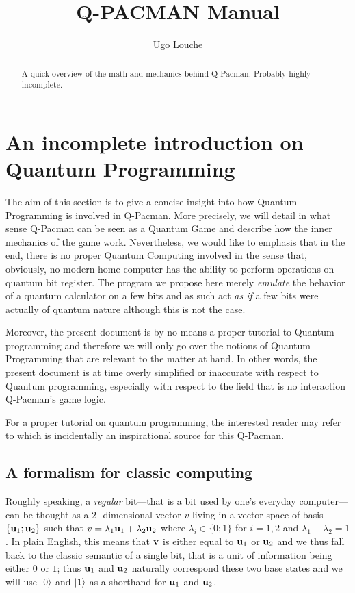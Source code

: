 \documentclass[a4paper]{article}
\title{Q-PACMAN Manual}
\author{Ugo Louche}
\begin{document}
\maketitle

\begin{abstract}
A quick overview of the math and mechanics behind Q-Pacman. Probably highly incomplete. 
\end{abstract}

\tableofcontents

\newpage

\section{An incomplete introduction on Quantum Programming}

The aim of this section is to give a concise insight into how Quantum Programming is involved in Q-Pacman. More precisely, we will detail in what sense Q-Pacman can be seen as a Quantum Game and describe how the inner mechanics of the game work. Nevertheless, we would like to emphasis that in the end, there is no proper Quantum Computing involved in the sense that, obviously, no modern home computer has the ability to perform operations on quantum bit register. The program we propose here merely \emph{emulate} the behavior of a quantum calculator on a few bits and as such act \emph{as if} a few bits were actually of quantum nature although this is not the case. 

Moreover, the present document is by no means a proper tutorial to Quantum programming and therefore we will only go over the notions of Quantum Programming that are relevant to the matter at hand. In other words, the present document is at time overly simplified or inaccurate with respect to Quantum programming, especially with respect to the field that is no interaction Q-Pacman’s game logic.

For a proper tutorial on quantum programming, the interested reader may refer to \cite{Valiron12} which is incidentally an inspirational source for this Q-Pacman.

\subsection{A formalism for classic computing}

Roughly speaking, a \emph{regular} bit---that is a bit used by one’s everyday computer---can be thought as a $2$- dimensional vector $v$ living in a vector space of basis $\lbrace \mathbf{u}_1 ; \mathbf{u}_2 \rbrace$ such that $v = \lambda_1 \mathbf{u}_1 + \lambda_2 \mathbf{u}_2$ where $\lambda_i \in \lbrace 0; 1 \rbrace$ for $i = 1, 2$ and $\lambda_1 + \lambda_2 = 1$. In plain English, this means that $\mathbf{v}$ is either equal to $\mathbf{u}_1$ or $\mathbf{u}_2$ and we thus fall back to the classic semantic of a single bit, that is a unit of information being either $0$ or $1$; thus $\mathbf{u}_1$ and $\mathbf{u}_2$ naturally correspond these two base states and we will use $\left| 0 \right>$ and $\left| 1 \right>$ as a shorthand for $\mathbf{u}_1$ and $\mathbf{u}_2$.
\end{document}
